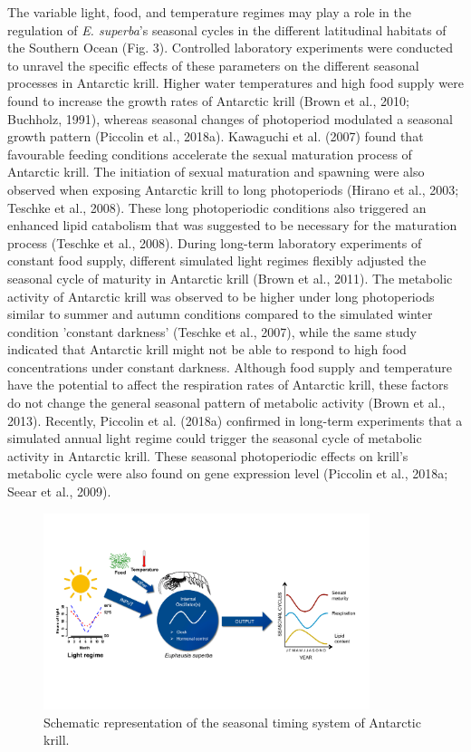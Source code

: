 The variable light, food, and temperature regimes may play a role in the
regulation of \textit{E. superba}'s seasonal cycles in the different latitudinal
habitats of the Southern Ocean (Fig. 3). Controlled laboratory experiments were
conducted to unravel the specific effects of these parameters on the different
seasonal processes in Antarctic krill. Higher water temperatures and high food
supply were found to increase the growth rates of Antarctic krill (Brown et
al., 2010; Buchholz, 1991), whereas seasonal changes of photoperiod modulated a
seasonal growth pattern (Piccolin et al., 2018a). Kawaguchi et al. (2007) found
that favourable feeding conditions accelerate the sexual maturation process of
Antarctic krill. The initiation of sexual maturation and spawning were also
observed when exposing Antarctic krill to long photoperiods (Hirano et al.,
2003; Teschke et al., 2008). These long photoperiodic conditions also triggered
an enhanced lipid catabolism that was suggested to be necessary for the
maturation process (Teschke et al., 2008). During long-term laboratory
experiments of constant food supply, different simulated light regimes flexibly
adjusted the seasonal cycle of maturity in Antarctic krill (Brown et al.,
2011). The metabolic activity of Antarctic krill was observed to be higher
under long photoperiods similar to summer and autumn conditions compared to the
simulated winter condition 'constant darkness' (Teschke et al., 2007), while
the same study indicated that Antarctic krill might not be able to respond to
high food concentrations under constant darkness. Although food supply and
temperature have the potential to affect the respiration rates of Antarctic
krill, these factors do not change the general seasonal pattern of metabolic
activity (Brown et al., 2013). Recently, Piccolin et al. (2018a) confirmed in
long-term experiments that a simulated annual light regime could trigger the
seasonal cycle of metabolic activity in Antarctic krill. These seasonal
photoperiodic effects on krill's metabolic cycle were also found on gene
expression level (Piccolin et al., 2018a; Seear et al., 2009). 


\begin{figure}
        \caption{Schematic representation of the seasonal timing system of Antarctic krill.}
        \centering
        \includegraphics[width=0.85\textwidth]{../Figures/Figure3.pdf}
\end{figure}

